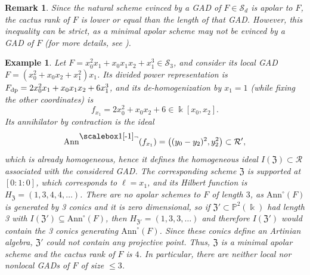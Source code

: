 \documentclass{amsart}
\theoremstyle{plain}
\newtheorem{example}[example]{Example}
\newtheorem{remark}[remark]{Remark}
\renewcommand{\k}{\Bbbk}
\renewcommand{\S}{\mathcal{S}}
\newcommand{\Ann}{\textnormal{Ann}}
\renewcommand{\P}{\mathbb{P}}
\newcommand{\ideal}[1]{\mathopen{}\bigl( #1 \bigr)\mathclose{}}
\newcommand{\contract}{\mathbin{\mathpalette\dointprod\relax}}
\newcommand{\dointprod}[2]{%
  \raisebox{\depth}{\scalebox{1}[-1]{$#1\lnot$}}}
\def\P{{\mathbb{P}}}
\def\R{\mathcal{R}}
\def\Z{\mathfrak{Z}}
\def\Ann{\mathrm{Ann}}
\numberwithin{equation}{section}
\begin{document}
\begin{remark} %
    Since the natural scheme evinced by a GAD of $F\in \S_d$ is apolar to $F$, the cactus rank of $F$ is lower or equal than the length of that GAD.
    However, this inequality can be strict, as a minimal apolar scheme may not be evinced by a GAD of $F$ (for more details, see ). 
\end{remark}
\begin{example} \label{ex:ex1-A}
    Let $F = x_0^2x_1 + x_0x_1x_2 + x_1^3 \in \S_3$, and consider its local GAD $F = (x_0^2+x_0x_2+x_1^2)x_1$.
    Its divided power representation is $F_{\rm dp} = 2x_0^2x_1 + x_0x_1x_2 + 6x_1^3$, and its de-homogenization by $x_1=1$ (while fixing the other coordinates) is
    \[ f_{x_1} = 2x_0^2 + x_0x_2 + 6 \in \k[x_0,x_2]. \]
    Its annihilator by contraction is the ideal
    \[ \Ann^{\contract}(f_{x_1}) = \ideal{ (y_0-y_2)^2, y_2^2 } \subset \R', \]
    which is already homogeneous, hence it defines the homogeneous ideal $I(\Z) \subset \R$ associated with the considered GAD.
    The corresponding scheme $\Z$ is supported at $[0:1:0]$, which corresponds to $\ell = x_1$, and its Hilbert function is $H_{\Z} = (1,3,4,4,\dots)$.
    There are no apolar schemes to $F$ of length $3$, as $\Ann^{\circ}(F)$ is generated by 3 conics and it is zero dimensional, so if $\Z' \subset \P^2(\k)$ had length 3 with $I(\Z') \subseteq \Ann^{\circ}(F)$, then $H_{\Z'}=(1,3,3,\dots)$ and therefore $I(\Z')$ would contain the 3 conics generating $\Ann^{\circ}(F)$.
    Since these conics define an Artinian algebra, $\Z'$ could not contain any projective point.
    Thus, $\Z$ is a minimal apolar scheme and the cactus rank of $F$ is $4$.
    In particular, there are neither local nor nonlocal GADs of $F$ of size $\leq 3$. 
\end{example}
\end{document}

